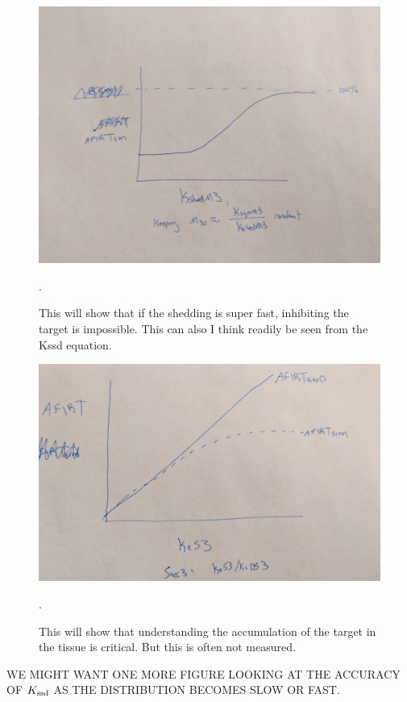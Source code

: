 \begin{figure}[H]
\centering
\includegraphics[width=\textwidth]{figures/FastShedding.jpg}
\caption{This will show that if the shedding is super fast, inhibiting the target is impossible.  This can also I think readily be seen from the Kssd equation. 
\label{fig:shedding}}.
\end{figure}

\begin{figure}[H]
\centering
\includegraphics[width=\textwidth]{figures/SolubleAccumulation.jpg}
\caption{This will show that understanding the accumulation of the target in the tissue is critical.  But this is often not measured.  
\label{fig:accumulation}}.
\end{figure}

WE MIGHT WANT ONE MORE FIGURE LOOKING AT THE ACCURACY OF $K_\text{ssd}$ AS THE DISTRIBUTION BECOMES SLOW OR FAST.